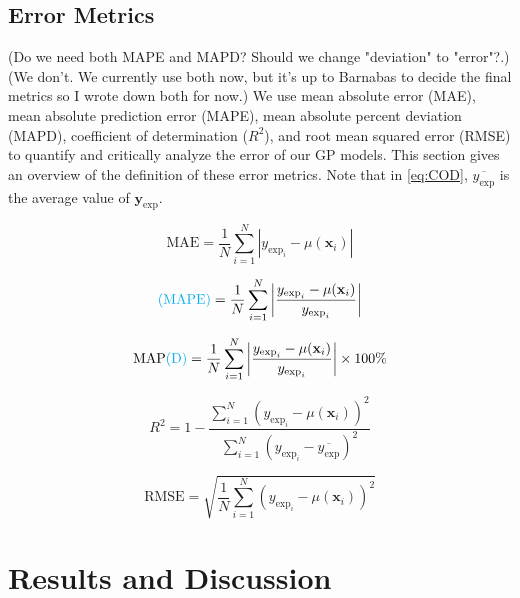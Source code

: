 \documentclass[journal=jacsat,manuscript=article]{achemso}
\newcommand{\mcnote}[1]{{\color{purple} (#1)}}
\newcommand{\alltodo}[1]{{\color{cyan} (#1)}}
\begin{document}
\subsection{Error Metrics}
\alltodo{Do we need both MAPE and MAPD? Should we change "deviation" to "error"?.}
\mcnote{We don't. We currently use both now, but it's up to Barnabas to decide the final metrics so I wrote down both for now.}
We use mean absolute error (MAE), mean absolute prediction error (MAPE), mean absolute percent deviation (MAPD), coefficient of determination ($R^2$), and root mean squared error (RMSE) to quantify and critically analyze the error of our GP models. This section gives an overview of the definition of these error metrics. Note that in \eqref{eq:COD}, $\overline{y_{\text{exp}}}$ is the average value of $\mathbf{y}_{\text{exp}}$. 

\begin{equation}
    \text{MAE} = \frac{1}{N} \sum_{i=1}^{N} \left| y_{\text{exp}_i} - \mu(\mathbf{x}_i) \right|
    \label{eq:MAE}
\end{equation}

\begin{equation}
    \alltodo{\text{MAPE}} = \frac{1}{N} \sum_{i=1}^{N} \left| \frac{y_{\text{exp}_i} - \mu(\mathbf{x}_i)}{y_{\text{exp}_i}} \right|
    \label{eq:MAPE}
\end{equation}

\begin{equation}
    \text{MAP\alltodo{D}} = \frac{1}{N} \sum_{i=1}^{N} \left| \frac{y_{\text{exp}_i} - \mu(\mathbf{x}_i)}{y_{\text{exp}_i}} \right| \times 100\%
    \label{eq:MAPD}
\end{equation}

\begin{equation}
    R^2 = 1 - \frac{\sum_{i=1}^{N} \left( y_{\text{exp}_i} - \mu(\mathbf{x}_i) \right)^2}{\sum_{i=1}^{N} \left( y_{\text{exp}_i} - \overline{y_{\text{exp}}} \right)^2}
    \label{eq:COD}
\end{equation}

\begin{equation}
    \text{RMSE} = \sqrt{\frac{1}{N} \sum_{i=1}^{N} \left( y_{\text{exp}_i} - \mu(\mathbf{x}_i) \right)^2}
    \label{eq:RMSE}
\end{equation}

\section{Results and Discussion}
\end{document}
